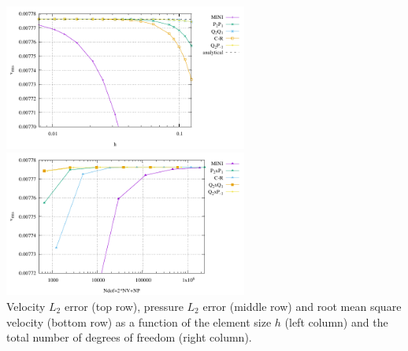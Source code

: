 \begin{center}
\includegraphics[width=8cm]{python_codes/fieldstone_112/results/exp1/vrms.pdf}
\includegraphics[width=8cm]{python_codes/fieldstone_112/results/exp1/vrms_ndof.pdf}\\
{\captionfont Velocity $L_2$ error (top row), pressure $L_2$ error (middle row) and root
mean square velocity (bottom row) as a function of the element size $h$ (left column) 
and the total number of degrees of freedom (right column).}
\end{center}

